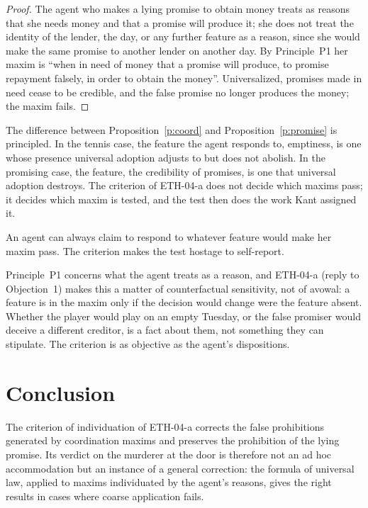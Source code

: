 \documentclass{situationist-preprint}
\begin{document}
\begin{proof}
The agent who makes a lying promise to obtain money treats as reasons that she needs money and that a promise will produce it; she does not treat the identity of the lender, the day, or any further feature as a reason, since she would make the same promise to another lender on another day. By Principle~P1 her maxim is \enquote{when in need of money that a promise will produce, to promise repayment falsely, in order to obtain the money}. Universalized, promises made in need cease to be credible, and the false promise no longer produces the money; the maxim fails.
\end{proof}

The difference between Proposition~\ref{p:coord} and Proposition~\ref{p:promise} is principled. In the tennis case, the feature the agent responds to, emptiness, is one whose presence universal adoption adjusts to but does not abolish. In the promising case, the feature, the credibility of promises, is one that universal adoption destroys. The criterion of ETH-04-a does not decide which maxims pass; it decides which maxim is tested, and the test then does the work Kant assigned it.

\begin{objection}
An agent can always claim to respond to whatever feature would make her maxim pass. The criterion makes the test hostage to self-report.
\end{objection}

\begin{reply}
Principle~P1 concerns what the agent treats as a reason, and ETH-04-a (reply to Objection~1) makes this a matter of counterfactual sensitivity, not of avowal: a feature is in the maxim only if the decision would change were the feature absent. Whether the player would play on an empty Tuesday, or the false promiser would deceive a different creditor, is a fact about them, not something they can stipulate. The criterion is as objective as the agent's dispositions.
\end{reply}

\section{Conclusion}

The criterion of individuation of ETH-04-a corrects the false prohibitions generated by coordination maxims and preserves the prohibition of the lying promise. Its verdict on the murderer at the door is therefore not an ad hoc accommodation but an instance of a general correction: the formula of universal law, applied to maxims individuated by the agent's reasons, gives the right results in cases where coarse application fails.
\end{document}
